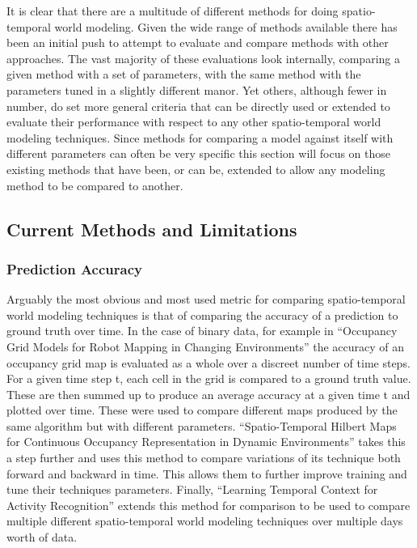   It is clear that there are a multitude of different methods for doing
  spatio-temporal world modeling. Given the wide range of methods available
  there has been an initial push to attempt to evaluate and compare methods
  with other approaches. The vast majority of these evaluations look internally,
  comparing a given method with a set of parameters, with the same method with
  the parameters tuned in a slightly different manor. Yet others, although fewer
  in number, do set more general criteria that can be directly used or extended
  to evaluate their performance with respect to any other spatio-temporal
  world modeling techniques. Since methods for comparing a model against itself
  with different parameters can often be very specific this section will focus
  on those existing methods that have been, or can be, extended to allow any
  modeling method to be compared to another.

  \subsection{ Current Methods and Limitations}

  \subsubsection { Prediction Accuracy }
  Arguably the most obvious and most used metric for comparing spatio-temporal
  world modeling techniques is that of comparing the accuracy of a prediction
  to ground truth over time. In the case of binary data, for example in
  ``Occupancy Grid Models for Robot Mapping in Changing Environments''
  \cite{Meyer-Delius2012} the accuracy of an occupancy grid map is evaluated as
  a whole over a discreet number of time steps. For a given time step t,
  each cell in the grid is compared to a ground truth value. These are then
  summed up to produce an average accuracy at a given time t and plotted over
  time. These were used to compare different maps produced by the same algorithm
  but with different parameters. ``Spatio-Temporal Hilbert Maps for Continuous
  Occupancy Representation in Dynamic Environments'' \cite{Senanayake2016}
  takes this a step further and uses this method to compare variations of its
  technique both forward and backward in time. This allows them to further
  improve training and tune their techniques parameters. Finally, ``Learning Temporal Context for Activity Recognition'' \cite{Coppola2016}
  extends this method for comparison to be used to compare multiple different
  spatio-temporal world modeling techniques over multiple days worth of data.

